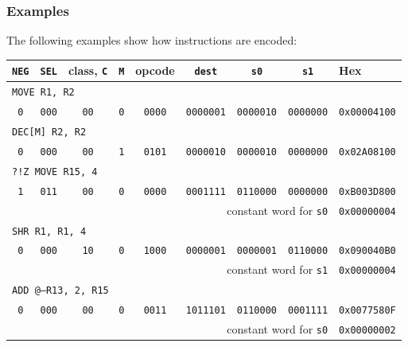 \documentclass{beamer}
\newcommand{\code}[1]{\texttt{#1}}
\begin{document}
   \begin{frame}
    \frametitle{Examples}
    The following examples show how instructions are encoded:
    {\footnotesize\setlength{\tabcolsep}{4pt}
    \begin{center}
     \begin{tabular}{|c|c|c|c|c|c|c|c||l|}
      \hline
       \code{NEG}&\code{SEL}&class, \code{C}&\code{M}&opcode&\code{dest}&\code{s0}&\code{s1}&Hex\\
      \hline
       \multicolumn{9}{|l|}{\code{MOVE R1, R2}}\\
       \code{0}&\code{000}&\code{00}&\code{0}&\code{0000}&\code{0000001}&\code{0000010}&\code{0000000}&\code{0x00004100}\\
      \hline
       \multicolumn{9}{|l|}{\code{DEC[M] R2, R2}}\\
       \code{0}&\code{000}&\code{00}&\code{1}&\code{0101}&\code{0000010}&\code{0000010}&\code{0000000}&\code{0x02A08100}\\
      \hline
       \multicolumn{9}{|l|}{\code{?!Z MOVE R15, 4}}\\
       \code{1}&\code{011}&\code{00}&\code{0}&\code{0000}&\code{0001111}&\code{0110000}&\code{0000000}&\code{0xB003D800}\\
       \multicolumn{8}{|r||}{constant word for \code{s0}}&\code{0x00000004}\\
      \hline
       \multicolumn{9}{|l|}{\code{SHR R1, R1, 4}}\\
       \code{0}&\code{000}&\code{10}&\code{0}&\code{1000}&\code{0000001}&\code{0000001}&\code{0110000}&\code{0x090040B0}\\
       \multicolumn{8}{|r||}{constant word for \code{s1}}&\code{0x00000004}\\
      \hline
       \multicolumn{9}{|l|}{\code{ADD @--R13, 2, R15}}\\
       \code{0}&\code{000}&\code{00}&\code{0}&\code{0011}&\code{1011101}&\code{0110000}&\code{0001111}&\code{0x0077580F}\\
       \multicolumn{8}{|r||}{constant word for \code{s0}}&\code{0x00000002}\\
      \hline
     \end{tabular}
    \end{center}
    }
   \end{frame}
%
\end{document}
